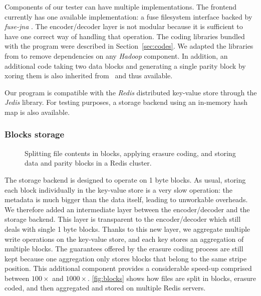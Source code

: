 Components of our tester can have multiple implementations. The frontend currently has one available implementation: a \ac{fuse} filesystem interface backed by \textit{fuse-jna} \autocite{fuse-jna}.
The encoder/decoder layer is not modular because it is sufficient to have one correct way of handling that operation. The coding libraries bundled with the program were described in Section~\ref{sec:codes}. We adapted the libraries from \autocite{XorbasVLDB} to remove dependencies on any \textit{Hadoop} component. In addition, an additional code taking two data blocks and generating a single parity block by xoring them is also inherited from~\autocite{XorbasVLDB} and thus available. 

Our program is compatible with the \textit{Redis} distributed key-value store through the \textit{Jedis} library. For testing purposes, a storage backend using an in-memory hash map is also available.

\subsubsection{Blocks storage}

\begin{figure}[H]
    \centering
    
    \caption{Splitting file contents in blocks, applying erasure coding, and storing data and parity blocks in a Redis cluster.}
    \label{fig:blocks}
\end{figure}

The storage backend is designed to operate on 1 byte blocks. 
As usual, storing each block individually in the key-value store is a very slow operation: the metadata is much bigger than the data itself, leading to unworkable overheads. We therefore added an intermediate layer between the encoder/decoder and the storage backend. This layer is transparent to the encoder/decoder which still deals with single 1 byte blocks. Thanks to this new layer, we aggregate multiple write operations on the key-value store, and each key stores an aggregation of multiple blocks.
The guarantees offered by the erasure coding process are still kept because one aggregation only stores blocks that belong to the same stripe position. This additional component provides a considerable speed-up comprised between $100\times$ and $1000\times$. \autoref{fig:blocks} shows how files are split in blocks, erasure coded, and then aggregated and stored on multiple Redis servers. 

